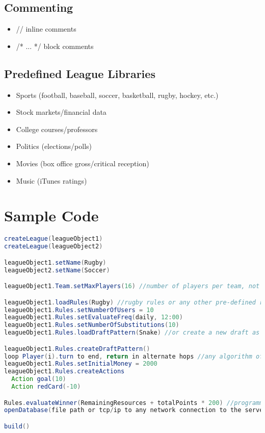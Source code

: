 \documentclass[12pt]{article}
\begin{document}
\subsection{Commenting}
\begin{itemize}
\setlength{\itemsep}{1pt}
\item // inline comments
\item /* ... */ block comments
\end{itemize}

\subsection{Predefined League Libraries}
\begin{itemize}
\setlength{\itemsep}{1pt}
\item Sports (football, baseball, soccer, basketball, rugby, hockey, etc.)
\item Stock markets/financial data
\item College courses/professors
\item Politics (elections/polls)
\item Movies (box office gross/critical reception)
\item Music (iTunes ratings)
\end{itemize}

\section{Sample Code}
\begin{lstlisting}[language=Java,label=some-code,caption=FLOOD sample code]
createLeague(leagueObject1)
createLeague(leagueObject2)

leagueObject1.setName(Rugby)
leagueObject2.setName(Soccer)

leagueObject1.Team.setMaxPlayers(16) //number of players per team, not the number of users

leagueObject1.loadRules(Rugby) //rugby rules or any other pre-defined rules
leagueObject1.Rules.setNumberOfUsers = 10
leagueObject1.Rules.setEvaluateFreq(daily, 12:00) 
leagueObject1.Rules.setNumberOfSubstitutions(10)
leagueObject1.Rules.loadDraftPattern(Snake) //or create a new draft as follows 

leagueObject1.Rules.createDraftPattern()
loop Player(i).turn to end, return in alternate hops //any algorithm of the programmer's choice
leagueObject1.Rules.setInitialMoney = 2000 
leagueObject1.Rules.createActions
  Action goal(10)
  Action redCard(-10)

Rules.evaluateWinner(RemainingResources + totalPoints * 200) //programmer determines what formula is be used 
openDatabase(file path or tcp/ip to any network connection to the server)

build()
\end{lstlisting}
\end{document}
